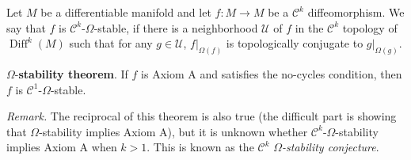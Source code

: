 \documentclass[12pt]{article}
\begin{document}

Let $M$ be a differentiable manifold and let $f\colon M\to M$ be a $\mathcal{C}^k$ diffeomorphism. We say that $f$ is $\mathcal{C}^k$-$\Omega$-stable, if there is a neighborhood $\mathcal{U}$ of $f$ in the $\mathcal{C}^k$ topology of $\operatorname{Diff}^k(M)$ such that for any $g\in \mathcal{U}$, $f|_{\Omega(f)}$ is topologically conjugate to $g|_{\Omega(g)}$.

$\Omega$-\textbf{stability theorem}. If $f$ is Axiom A and satisfies the no-cycles condition, then $f$ is $\mathcal{C}^1$-$\Omega$-stable.

\emph{Remark.} The reciprocal of this theorem is also true (the difficult part is showing that $\Omega$-stability implies Axiom A), but it is unknown whether $\mathcal{C}^k$-$\Omega$-stability implies Axiom A when $k>1$. This is known as the $\mathcal{C}^k$ \emph{$\Omega$-stability conjecture}.
\end{document}

